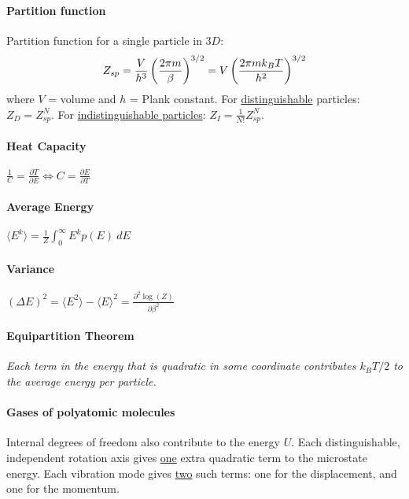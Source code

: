 \paragraph{Partition function}
Partition function for a single particle in $3D$:
\begin{align*}
    Z_{sp}
    = \frac{V}{h^3} \left( \frac{2 \pi m}{\beta} \right)^{3/2}
    = V \left( \frac{2 \pi m k_B T}{h^2} \right)^{3/2}
\end{align*}
where $V$ = volume and $h$ = Plank constant. For \underline{distinguishable}
particles: $Z_D = Z_{sp}^N$.
For \underline{indistinguishable particles}: $Z_I = \frac{1}{N!} Z_{sp}^N$.

\paragraph{Heat Capacity}
$\frac{1}{C} = \frac{\partial T}{\partial E} \Leftrightarrow
C = \frac{\partial E}{\partial T}$

\paragraph{Average Energy}
$\langle E^k \rangle = \frac{1}{Z} \int_0^\infty E^k p(E) \ dE$

\paragraph{Variance}
$(\Delta E)^2 = \langle E^2 \rangle - \langle E \rangle^2 = \frac{\partial^2 \log(Z)}{\partial \beta^2}$

\paragraph{Equipartition Theorem}
\textit{Each term in the energy that is quadratic in some coordinate contributes
$k_B T / 2$ to the average energy per particle.}

\paragraph{Gases of polyatomic molecules}
Internal degrees of freedom also contribute to the energy $U$. Each distinguishable,
independent rotation axis gives \underline{one} extra quadratic term to the
microstate energy. Each vibration mode gives \underline{two} such terms: one for
the displacement, and one for the momentum.


